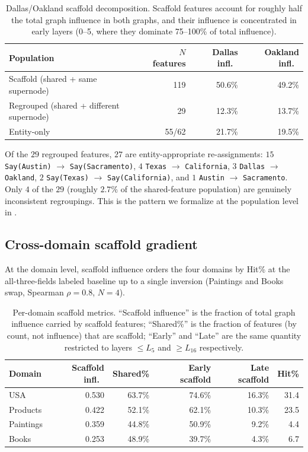 \begin{table}[h]
\centering\small
\begin{tabular}{lrrr}
\toprule
Population & $N$ features & Dallas infl.\ & Oakland infl.\ \\
\midrule
Scaffold (shared + same supernode)        & 119    & 50.6\% & 49.2\% \\
Regrouped (shared + different supernode)  &  29    & 12.3\% & 13.7\% \\
Entity-only                                & 55/62 & 21.7\% & 19.5\% \\
\bottomrule
\end{tabular}
\caption{Dallas/Oakland scaffold decomposition. Scaffold features account for roughly half the total graph influence in both graphs, and their influence is concentrated in early layers (0--5, where they dominate 75--100\% of total influence).}
\label{tab:dallas-oakland}
\end{table}

Of the $29$ regrouped features, $27$ are entity-appropriate re-assignments: $15$ \texttt{Say(Austin)} $\to$ \texttt{Say(Sacramento)}, $4$ \texttt{Texas} $\to$ \texttt{California}, $3$ \texttt{Dallas} $\to$ \texttt{Oakland}, $2$ \texttt{Say(Texas)} $\to$ \texttt{Say(California)}, and $1$ \texttt{Austin} $\to$ \texttt{Sacramento}. Only $4$ of the $29$ (roughly $2.7\%$ of the shared-feature population) are genuinely inconsistent regroupings. This is the pattern we formalize at the population level in .

\subsection{Cross-domain scaffold gradient}
At the domain level, scaffold influence orders the four domains by Hit\% at the all-three-fields labeled baseline up to a single inversion (Paintings and Books swap, Spearman $\rho{=}0.8$, $N{=}4$).

\begin{table}[h]
\centering\small
\begin{tabular}{lrrrrr}
\toprule
Domain    & Scaffold infl.\ & Shared\% & Early scaffold & Late scaffold & Hit\% \\
\midrule
USA       & 0.530 & 63.7\% & 74.6\% & 16.3\% & 31.4 \\
Products  & 0.422 & 52.1\% & 62.1\% & 10.3\% & 23.5 \\
Paintings & 0.359 & 44.8\% & 50.9\% &  9.2\% &  4.4 \\
Books     & 0.253 & 48.9\% & 39.7\% &  4.3\% &  6.7 \\
\bottomrule
\end{tabular}
\caption{Per-domain scaffold metrics. ``Scaffold influence'' is the fraction of total graph influence carried by scaffold features; ``Shared\%'' is the fraction of features (by count, not influence) that are scaffold; ``Early'' and ``Late'' are the same quantity restricted to layers $\leq L_5$ and $\geq L_{16}$ respectively.}
\label{tab:scaffold-domain}
\end{table}

